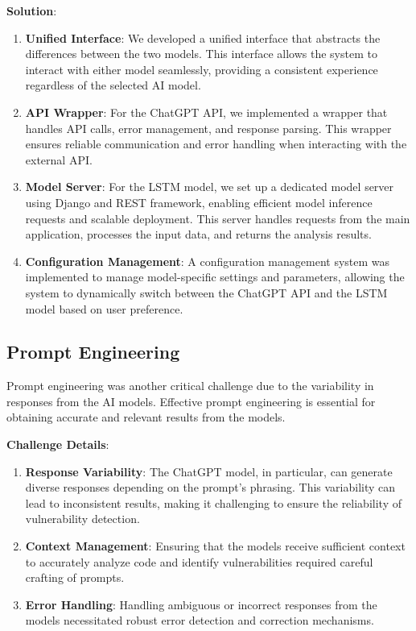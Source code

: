 \textbf{Solution}:
\begin{enumerate}
    \item \textbf{Unified Interface}: We developed a unified interface that abstracts the differences between the two models. This interface allows the system to interact with either model seamlessly, providing a consistent experience regardless of the selected AI model.
    \item \textbf{API Wrapper}: For the ChatGPT API, we implemented a wrapper that handles API calls, error management, and response parsing. This wrapper ensures reliable communication and error handling when interacting with the external API.
    \item \textbf{Model Server}: For the LSTM model, we set up a dedicated model server using Django and REST framework, enabling efficient model inference requests and scalable deployment. 
    This server handles requests from the main application, processes the input data, and returns the analysis results.
    \item \textbf{Configuration Management}: A configuration management system was implemented to manage model-specific settings and parameters, allowing the system to dynamically switch between the ChatGPT API and the LSTM model based on user preference.
\end{enumerate}

\subsection{Prompt Engineering}
Prompt engineering was another critical challenge due to the variability in responses from the AI models. Effective prompt engineering is essential for obtaining accurate and relevant results from the models.

\textbf{Challenge Details}:
\begin{enumerate}
\item \textbf{Response Variability}: The ChatGPT model, in particular, can generate diverse responses depending on the prompt's phrasing. 
This variability can lead to inconsistent results, making it challenging to ensure the reliability of vulnerability detection.
\item \textbf{Context Management}: Ensuring that the models receive sufficient context to accurately analyze code and identify vulnerabilities required careful crafting of prompts.
\item \textbf{Error Handling}: Handling ambiguous or incorrect responses from the models necessitated robust error detection and correction mechanisms.
\end{enumerate}

